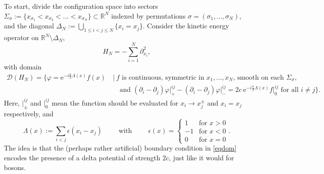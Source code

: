\documentclass[a4paper,11pt]{article}
\newcommand{\euler}[1]{\text{e}^{#1}}
\newcommand{\R}{\mathbb{R}}
\numberwithin{equation}{section}
\begin{document}
To start, divide the configuration space into sectors $ \Sigma_\sigma:=\{x_{\sigma_1}<x_{\sigma_2}<\dots<x_{\sigma_N}\}\subset \R^N $ indexed by permutations $ \sigma=(\sigma_1,\dots,\sigma_N) $, and the diagonal 
$\Delta_N:=\bigcup_{1\leq i<j\leq N}\{x_i=x_j\}$. Consider the kinetic energy operator on $\R^N\setminus\Delta_N$,
\begin{equation}
H_N=-\sum_{i=1}^{N}\partial_{x_i}^2,
\end{equation}
with domain \begin{equation}
\label{eqdom}
\begin{aligned}
\mathcal{D}(H_N)=\bigg\{\varphi=\euler{-i\frac{\kappa}{2}\Lambda(x)}f(x)&\ \bigg\vert\ f \text{ is continuous, symmetric in $x_1,\dots,x_N$, smooth on each $\Sigma_\sigma$,}\\&\quad \ \text{and } (\partial_i-\partial_j)\varphi\rvert^{ij}_+-(\partial_i-\partial_j)\varphi\rvert^{ij}_-=2c\ \euler{-i\frac{\kappa}{2}\Lambda(x)} f\rvert^{ij}_0 \text{ for all }i\neq j \bigg\}.
\end{aligned}
\end{equation}
Here, $ \vert^{ij}_{\pm} $ and $\vert^{ij}_{0}$ mean the function should be evaluated for $ x_i\to x_j^{\pm}$ and $x_i=x_j$ respectively, and  
\begin{equation}
\Lambda(x):= \sum_{i<j}\epsilon(x_i-x_j)\hspace{1cm}\text{with}\hspace{1cm} \epsilon(x)=\begin{cases}
			1&\text{for }x>0\\
			-1&\text{for }x<0\\
			0&\text{for }x=0
			\end{cases}.
\end{equation} The idea is that the (perhaps rather artificial) boundary condition in \eqref{eqdom} encodes the presence of a delta potential of strength $2c$, just like it would for bosons. 
\end{document}
